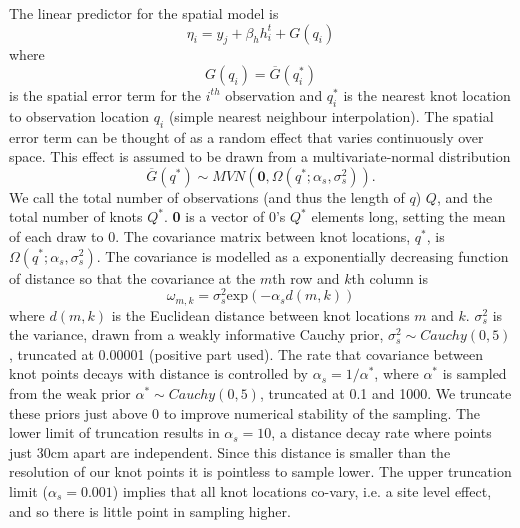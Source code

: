\documentclass[12pt,a4paper]{article}
\begin{document}
The linear predictor for the spatial model is 
\begin{equation}
	\label{eq:spp_lp}
	\eta_i = y_j + \beta_h h_i^t + G(q_i)	  
\end{equation}      
where 
\begin{equation} \label{eq:SPP_term}
	G(q_i) = \overline{G}(q_i^*)  
\end{equation}
is the spatial error term for the $i^{th}$ observation and $q_i^*$ is the nearest knot location to observation location $q_i$ (simple nearest neighbour interpolation). The spatial error term can be thought of as a random effect that varies continuously over space. This effect is assumed to be drawn from a multivariate-normal distribution     
\begin{equation}
	\overline{G}(q^*) \sim MVN(\textbf{0}, \Omega(q^*; \alpha_s, \sigma_s^2)).
\end{equation}           
We call the total number of observations (and thus the length of $q$) $Q$, and the total number of knots $Q^*$. \textbf{0} is a vector of 0's $Q^*$ elements long, setting the mean of each draw to 0. The covariance matrix between knot locations, $q^*$, is $\Omega(q^*; \alpha_s, \sigma_s^2)$. The covariance is modelled as a exponentially decreasing function of distance so that the covariance at the $m$th row and $k$th column is  
\begin{equation}
	\label{eq:covar}
	\omega_{m,k} = \sigma_s^2 \text{exp}(-\alpha_s d(m, k))
\end{equation} 
where $d(m, k)$ is the Euclidean distance between knot locations $m$ and $k$. $\sigma_s^2$ is the variance, drawn from a weakly informative Cauchy prior, $\sigma_s^2 \sim Cauchy(0, 5)$, truncated at 0.00001 (positive part used). The rate that covariance between knot points decays with distance is controlled by $\alpha_s = 1 / \alpha^*$, where $\alpha^*$ is sampled from the weak prior $\alpha^* \sim Cauchy(0, 5)$, truncated at 0.1 and 1000. We truncate these priors just above 0 to improve numerical stability of the sampling. The lower limit of truncation results in $\alpha_s = 10$, a distance decay rate where points just 30cm apart are independent. Since this distance is smaller than the resolution of our knot points it is pointless to sample lower. The upper truncation limit ($\alpha_s = 0.001$) implies that all knot locations co-vary, i.e. a site level effect, and so there is little point in sampling higher.         
\end{document}
